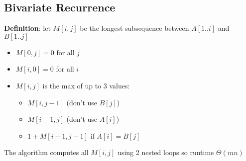 \documentclass[11pt]{article}
\begin{document}
\subsection{Bivariate Recurrence}
\label{sec:orgd1af8be}
\textbf{Definition}: let \(M[i,j]\) be the longest subsequence between \(A[1..i]\) and \(B[1..j]\)
\begin{itemize}
\item \(M[0, j] = 0\) for all \(j\)
\item \(M[i, 0] = 0\) for all \(i\)
\item \(M[i, j]\) is the max of up to 3 values:
\begin{itemize}
\item \(M[i, j-1]\) (don't use \(B[j]\))
\item \(M[i-1, j]\) (don't use \(A[i]\))
\item \(1 + M[i-1, j-1]\) if \(A[i] = B[j]\)
\end{itemize}
\end{itemize}

The algorithm computes all \(M[i, j]\) using 2 nested loops so runtime \(\Theta(mn)\)
\end{document}
